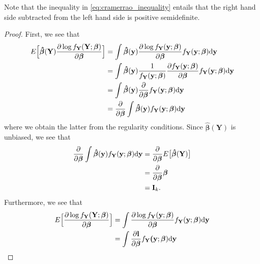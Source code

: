 Note that the inequality in \eqref{eq:cramerrao_inequality} entails that the right hand side subtracted from the left hand side is positive semidefinite.

\begin{proof}
First, we see that
\begin{align*}
    E\Big[\boldsymbol{\hat{\beta}}(\textbf{Y}) \frac{\partial \log f_\textbf{Y}(\textbf{Y};\boldsymbol{\beta})}{\partial \boldsymbol{\beta}} \Big]
    &=\int \boldsymbol{\hat{\beta}}(\textbf{y})\frac{\partial \log f_\textbf{Y}(\textbf{y};\boldsymbol{\beta})}{\partial \boldsymbol{\beta}}f_\textbf{Y}(\textbf{y};\boldsymbol{\beta}) \text{d\textbf{y}} \\
    &= \int \boldsymbol{\hat{\beta}}(\textbf{y})\frac{1}{f_\textbf{Y}(\textbf{y};\boldsymbol{\beta})}\frac{\partial f_\textbf{Y}(\textbf{y};\boldsymbol{\beta})}{\partial \boldsymbol{\beta}}f_\textbf{Y}(\textbf{y}
    ;\boldsymbol{\beta}) \text{d\textbf{y}} \\
    &=\int \boldsymbol{\hat{\beta}}(\textbf{y}) \frac{\partial}{\partial \boldsymbol{\beta}}f_\textbf{Y}(\textbf{y};\boldsymbol{\beta}) \text{d\textbf{y}} \\
    &=\frac{\partial}{\partial \boldsymbol{\beta}} \int \boldsymbol{\hat{\beta}}(\textbf{y}) f_\textbf{Y}(\textbf{y};\boldsymbol{\beta}) \text{d\textbf{y}}
\end{align*}
where we obtain the latter from the regularity conditions. 
Since $\boldsymbol{\hat{\beta}}(\textbf{Y})$ is unbiased, we see that
\begin{align}
    \frac{\partial}{\partial \boldsymbol{\beta}} \int \boldsymbol{\hat{\beta}}(\textbf{y}) f_\textbf{Y}(\textbf{y};\boldsymbol{\beta}) \text{d\textbf{y}} &= \frac{\partial}{\partial\boldsymbol{\beta}} E\big[ \boldsymbol{\hat{\beta}}(\textbf{Y})\big] \nonumber\\
    &= \frac{\partial}{\partial\boldsymbol{\beta}} \boldsymbol{\beta} \nonumber\\
    &= \textbf{I}_{k} \label{eq:cramerraoe2stjerner}.
\end{align}
Furthermore, we see that
\begin{align}
    E\Big[ \frac{\partial \log f_\textbf{Y}(\textbf{Y};\boldsymbol{\beta})}{\partial \boldsymbol{\beta}}\Big] &= \int \frac{\partial \log f_\textbf{Y}(\textbf{y};\boldsymbol{\beta})}{\partial\boldsymbol{\beta}}f_\textbf{Y}(\textbf{y};\boldsymbol{\beta}) \text{d\textbf{y}} \nonumber \\
    &=\int  \frac{\partial\textbf{l}}{\partial \boldsymbol{\beta}}f_\textbf{Y}\textbf{(}\textbf{y};\boldsymbol{\beta}) \text{d\textbf{y}} \nonumber \\

\end{align}
\end{proof}
